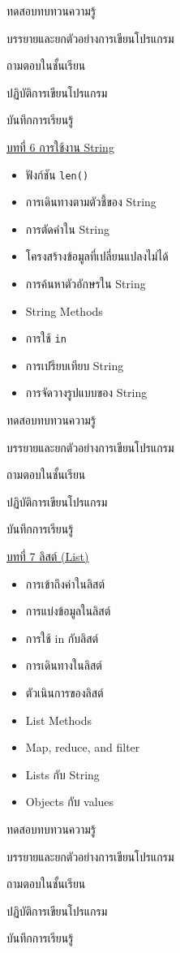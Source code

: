 {
\item ทดสอบทบทวนความรู้
\item  บรรยายและยกตัวอย่างการเขียนโปรแกรม
\item  ถามตอบในชั้นเรียน
\item  ปฏิบัติการเขียนโปรแกรม
\item  บันทึกการเรียนรู้
}
{
\underline{บทที่ 6 การใช้งาน String}
\begin{itemize}
\item ฟังก์ชัน \texttt{len()}
\item การเดินทางตามตัวชี้ของ String
\item การตัดคำใน String
\item โครงสร้างข้อมูลที่เปลี่ยนแปลงไม่ได้
\item การค้นหาตัวอักษรใน String
\item String Methods
\item การใช้  \texttt{in}
\item การเปรียบเทียบ String
\item การจัดวางรูปแบบของ String

\end{itemize}

}
{
\item ทดสอบทบทวนความรู้
\item  บรรยายและยกตัวอย่างการเขียนโปรแกรม
\item  ถามตอบในชั้นเรียน
\item  ปฏิบัติการเขียนโปรแกรม
\item  บันทึกการเรียนรู้
}
{
\underline{บทที่ 7 ลิสต์ (List)}
\begin{itemize}
\item การเข้าถึงค่าในลิสต์
\item การแบ่งข้อมูลในลิสต์
\item การใช้ in กับลิสต์
\item การเดินทางในลิสต์
\item ตัวเนินการของลิสต์
\item List Methods
\item Map, reduce, and filter
\item Lists กับ String
\item Objects กับ values
\end{itemize}
}
{
\item ทดสอบทบทวนความรู้
\item  บรรยายและยกตัวอย่างการเขียนโปรแกรม
\item  ถามตอบในชั้นเรียน
\item  ปฏิบัติการเขียนโปรแกรม
\item  บันทึกการเรียนรู้
}
